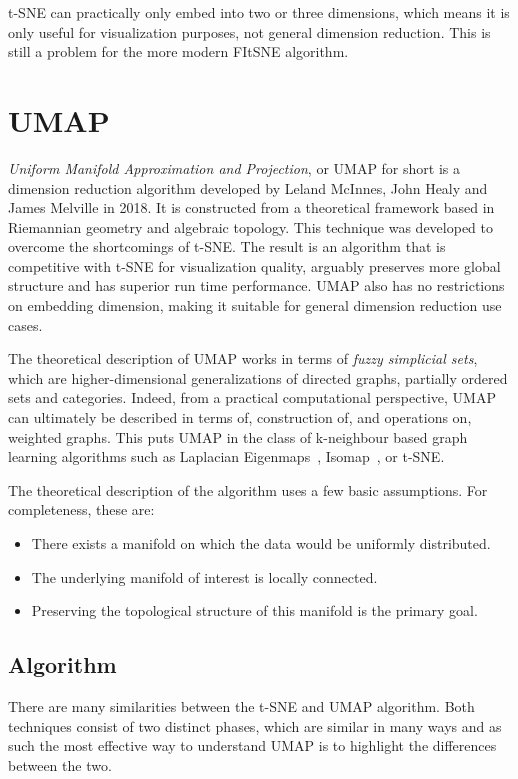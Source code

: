 t-SNE can practically only embed into two or three dimensions, which means it is only useful for visualization purposes, not general dimension reduction. This is still a problem for the more modern FItSNE algorithm.

\section{UMAP}\label{sec:umap}

\textit{Uniform Manifold Approximation and Projection}\cite{bib:umap}, or UMAP for short is a dimension reduction algorithm developed by Leland McInnes, John Healy and James Melville in 2018. It is constructed from a theoretical framework based in Riemannian geometry and algebraic topology. This technique was developed to overcome the shortcomings of t-SNE. The result is an algorithm that is competitive with t-SNE for visualization quality, arguably preserves more global structure and has superior run time performance. UMAP also has no restrictions on embedding dimension, making it suitable for general dimension reduction use cases.

The theoretical description of UMAP works in terms of \textit{fuzzy simplicial sets}, which are higher-dimensional generalizations of directed graphs, partially ordered sets and categories. Indeed, from a practical computational perspective, UMAP can ultimately be described in terms of, construction of, and operations on, weighted graphs. This puts UMAP in the class of k-neighbour based graph learning algorithms such as Laplacian Eigenmaps~\cite{bib:laplacian_eigenmaps}, Isomap~\cite{bib:isomap}, or t-SNE\@.

The theoretical description of the algorithm uses a few basic assumptions. For completeness, these are:

\begin{itemize}
	\item There exists a manifold on which the data would be uniformly distributed.
	\item The underlying manifold of interest is locally connected.
	\item Preserving the topological structure of this manifold is the primary goal.
\end{itemize}

\subsection{Algorithm}

There are many similarities between the t-SNE and UMAP algorithm. Both techniques consist of two distinct phases, which are similar in many ways and as such the most effective way to understand UMAP is to highlight the differences between the two.

